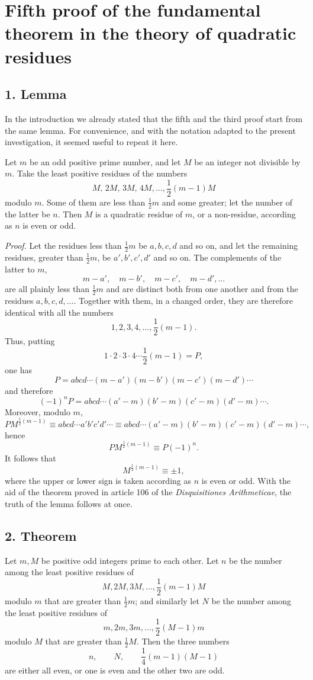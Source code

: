 \documentclass[12pt]{article}
\begin{document}
\section*{Fifth proof of the fundamental theorem in the theory of quadratic residues}

\subsection*{1. Lemma}

In the introduction we already stated that the fifth and the third proof start from the same lemma. For convenience, and with the notation adapted to the present investigation, it seemed useful to repeat it here.

Let $m$ be an odd positive prime number, and let $M$ be an integer not divisible by $m$. Take the least positive residues of the numbers
\[
M,\,2M,\,3M,\,4M,\ldots,\frac12(m-1)M
\]
modulo $m$. Some of them are less than $\frac12m$ and some greater; let the number of the latter be $n$. Then $M$ is a quadratic residue of $m$, or a non-residue, according as $n$ is even or odd.

\emph{Proof.} Let the residues less than $\frac12m$ be $a,b,c,d$ and so on, and let the remaining residues, greater than $\frac12m$, be $a',b',c',d'$ and so on. The complements of the latter to $m$,
\[
m-a',\quad m-b',\quad m-c',\quad m-d',\ldots
\]
are all plainly less than $\frac12m$ and are distinct both from one another and from the residues $a,b,c,d,\ldots$. Together with them, in a changed order, they are therefore identical with all the numbers
\[
1,2,3,4,\ldots,\frac12(m-1).
\]
Thus, putting
\[
1\cdot2\cdot3\cdot4\cdots \frac12(m-1)=P,
\]
one has
\[
P=abcd\cdots(m-a')(m-b')(m-c')(m-d')\cdots
\]
and therefore
\[
(-1)^nP=abcd\cdots(a'-m)(b'-m)(c'-m)(d'-m)\cdots .
\]
Moreover, modulo $m$,
\[
PM^{\frac12(m-1)}
 \equiv abcd\cdots a'b'c'd'\cdots
 \equiv abcd\cdots(a'-m)(b'-m)(c'-m)(d'-m)\cdots,
\]
hence
\[
PM^{\frac12(m-1)}\equiv P(-1)^n.
\]
It follows that
\[
M^{\frac12(m-1)}\equiv \pm1,
\]
where the upper or lower sign is taken according as $n$ is even or odd. With the aid of the theorem proved in article 106 of the \emph{Disquisitiones Arithmeticae}, the truth of the lemma follows at once.

\subsection*{2. Theorem}

Let $m,M$ be positive odd integers prime to each other. Let $n$ be the number among the least positive residues of
\[
M,2M,3M,\ldots,\frac12(m-1)M
\]
modulo $m$ that are greater than $\frac12m$; and similarly let $N$ be the number among the least positive residues of
\[
m,2m,3m,\ldots,\frac12(M-1)m
\]
modulo $M$ that are greater than $\frac12M$. Then the three numbers
\[
n,\qquad N,\qquad \frac14(m-1)(M-1)
\]
are either all even, or one is even and the other two are odd.
\end{document}
